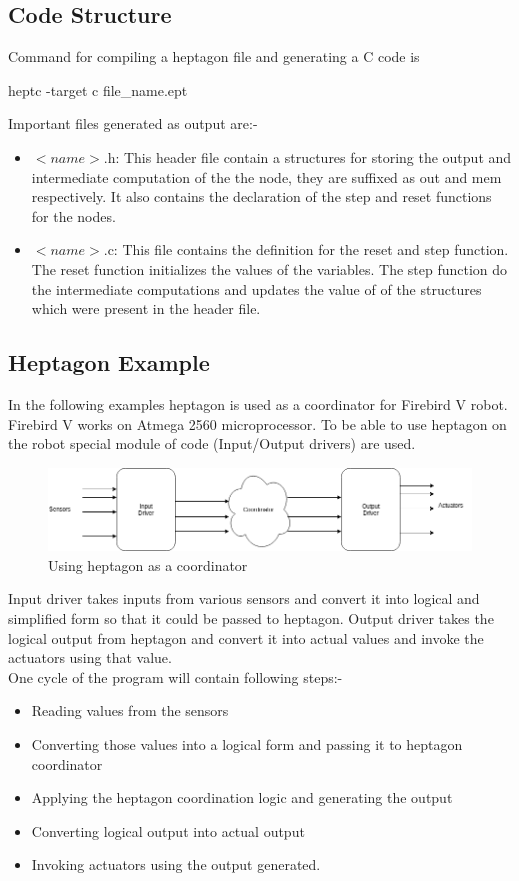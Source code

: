 \documentclass[16pt]{report}
\begin{document}
\subsection{Code Structure}
Command for compiling a heptagon file and generating a C code is\\
{

\centering
heptc -target c file\_name.ept

}
Important files generated as output are:-
\begin{itemize}
    \item $<name>$.h: This header file contain a structures for storing the output and intermediate computation of the the node, they are suffixed as out and mem respectively. It also contains the declaration of the step and reset functions for the nodes.
    \item $<name>$.c: This file contains the definition for the reset and step function. The reset function initializes the values of the variables. The step function do the intermediate computations and updates the value of of the structures which were present in the header file.
\end{itemize}{}

\subsection{Heptagon Example}
In the following examples heptagon is used as a coordinator for Firebird V robot. Firebird V works on Atmega 2560 microprocessor. To be able to use heptagon on the robot special module of code (Input/Output drivers) are used. 



\begin{figure}[H]
\includegraphics[width=\linewidth]{fig7.png}
\caption{Using heptagon as a coordinator}
\end{figure}

Input driver takes inputs from various sensors and convert it into logical and simplified form so that it could be passed to heptagon. Output driver takes the logical output from heptagon and convert it into actual values and invoke the actuators using that value.\\
One cycle of the program will contain following steps:-
\begin{itemize}
    \item Reading values from the sensors
    \item Converting those values into a logical form and passing it to heptagon coordinator
    \item Applying the heptagon coordination logic and generating the output
    \item Converting logical output into actual output
    \item Invoking actuators using the output  generated.
\end{itemize}{}
\end{document}
